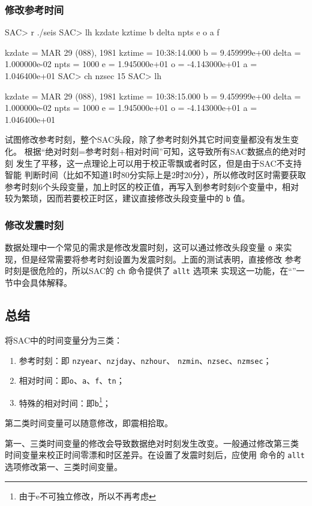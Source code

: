\subsubsection{修改参考时间}
\begin{SACCode}
SAC> r ./seis
SAC> lh kzdate kztime b delta npts e o a f

     kzdate = MAR 29 (088), 1981
     kztime = 10:38:14.000
          b = 9.459999e+00
      delta = 1.000000e-02
       npts = 1000
          e = 1.945000e+01
          o = -4.143000e+01
          a = 1.046400e+01
SAC> ch nzsec 15
SAC> lh

     kzdate = MAR 29 (088), 1981
     kztime = 10:38:15.000
          b = 9.459999e+00
      delta = 1.000000e-02
       npts = 1000
          e = 1.945000e+01
          o = -4.143000e+01
          a = 1.046400e+01
\end{SACCode}

试图修改参考时刻，整个SAC头段，除了参考时刻外其它时间变量都没有发生变化。
根据``绝对时刻=参考时刻+相对时间''可知，这导致所有SAC数据点的绝对时刻
发生了平移，这一点理论上可以用于校正零飘或者时区，但是由于SAC不支持智能
判断时间（比如不知道1时80分实际上是2时20分），所以修改时区时需要获取
参考时刻6个头段变量，加上时区的校正值，再写入到参考时刻6个变量中，相对
较为繁琐，因而若要校正时区，建议直接修改头段变量中的 \texttt{b} 值。

\subsubsection{修改发震时刻}
数据处理中一个常见的需求是修改发震时刻，这可以通过修改头段变量 \texttt{o}
来实现，但是经常需要将参考时刻设置为发震时刻。上面的测试表明，直接修改
参考时刻是很危险的，所以SAC的 \texttt{ch} 命令提供了 \texttt{allt} 选项来
实现这一功能，在``''一节中会具体解释。

\subsection{总结}
将SAC中的时间变量分为三类：
\begin{enumerate}
\item 参考时刻：即 \texttt{nzyear}、\texttt{nzjday}、\texttt{nzhour}、
    \texttt{nzmin}、\texttt{nzsec}、\texttt{nzmsec}；
\item 相对时间：即\texttt{o}、\texttt{a}、\texttt{f}、\texttt{tn}；
\item 特殊的相对时间：即\texttt{b}\footnote{由于e不可独立修改，所以不再考虑}；
\end{enumerate}

第二类时间变量可以随意修改，即震相拾取。

第一、三类时间变量的修改会导致数据绝对时刻发生改变。一般通过修改第三类
时间变量来校正时间零漂和时区差异。在设置了发震时刻后，应使用
 命令的 \texttt{allt} 选项修改第一、三类时间变量。
